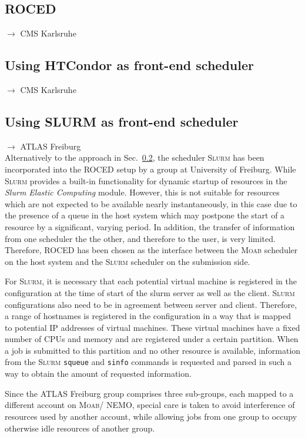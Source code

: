 \subsection{ROCED}
$\to$ CMS Karlsruhe
\subsection{Using HTCondor as front-end scheduler}\label{sec:ROCED:HTCondor}
$\to$ CMS Karlsruhe

\subsection{Using SLURM as front-end scheduler}
$\to$ ATLAS Freiburg\\
Alternatively to the approach in Sec.~\ref{sec:ROCED:HTCondor}, the
scheduler \textsc{Slurm} has been incorporated into the ROCED setup by
a group at University of Freiburg.
While \textsc{Slurm} provides a built-in functionality for dynamic
startup of resources in the \textit{Slurm Elastic Computing} module\cite{SlurmElastic}. 
However, this is not suitable for resources which are not
expected to be available nearly instantaneously, in this case due to
the presence of a queue in the host system which may postpone the start
of a resource by a significant, varying period.
In addition, the transfer of information from one scheduler the the
other, and therefore to the user, is very limited.
Therefore, ROCED has been chosen as the interface between the
\textsc{Moab} scheduler on the host system and the \textsc{Slurm}
scheduler on the submission side.

For \textsc{Slurm}, it is necessary that each potential virtual
machine is registered in the configuration at the time of start of the
slurm server as well as the client. \textsc{Slurm} configurations also
need to be in agreement between server and client.
Therefore, a range of hostnames is registered in the configuration in
a way that is mapped to potential IP addresses of virtual machines.
These virtual machines have a fixed number of CPUs and memory and are
registered under a certain partition.
When a job is submitted to this partition and no other resource is
available, information from the \textsc{Slurm} \texttt{squeue} and
\texttt{sinfo} commands is requested and parsed in such a way to
obtain the amount of requested information.

Since the ATLAS Freiburg group comprises three sub-groups, each mapped
to a different account on \textsc{Moab}/ NEMO, special care is taken to
avoid interference of resources used by another account, while
allowing jobs from one group to occupy otherwise idle resources of another group.


